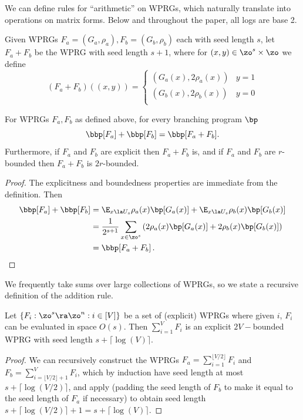 \documentclass{toc}
\begin{document}
We can define rules for ``arithmetic'' on WPRGs, which naturally translate into operations on matrix forms. Below and throughout the paper, all logs are base 2.

\begin{definition}\label{def:addRule}
Given WPRGs $F_a=(G_a,\rho_a),F_b=(G_b,\rho_b)$ each with seed length $s$, let $F_a+F_b$ be the WPRG with seed length $s+1$, where for $(x,y)\in \zo^s\times\zo$ we define
\[
(F_a+F_b)((x,y)) = \begin{cases}
(G_a(x),2\rho_a(x)) & y=1\\
(G_b(x),2\rho_b(x)) & y=0\\
\end{cases}\]
\end{definition}
\begin{lemma}
For WPRGs $F_a,F_b$ as defined above, for every branching program $\bp$
$$\bbp[F_a]+\bbp[F_b]=\bbp[F_a+F_b].$$
Furthermore, if $F_a$ and $F_b$ are explicit then $F_a+F_b$ is, and if $F_a$ and $F_b$ are $r$-bounded then $F_a+F_b$ is $2r$-bounded.
\end{lemma}
\begin{proof}
The explicitness and boundedness properties are immediate from the definition.
Then %
\begin{align*}
    \bbp[F_a]+\bbp[F_b] &= \E_{x\la U_s}\rho_a(x)\bp[G_a(x)]+\E_{x\la U_s}\rho_b(x)\bp[G_b(x)]\\
    &= \frac{1}{2^{s+1}}\sum_{x\in \zo^s}\left(2\rho_a(x)\bp[G_a(x)]+2\rho_b(x)\bp[G_b(x)]\right)\\
    &= \bbp[F_a+F_b]\,.  \qedhere
\end{align*}
\end{proof}
We frequently take sums over large collections of WPRGs, so we state a recursive definition of the addition rule.
\begin{proposition}\label{prop:multiAdd}
Let $\{F_i:\zo^s\ra\zo^n:i\in [V]\}$ be a set of (explicit) WPRGs where given $i$, $F_i$ can be evaluated in space $O(s)$. Then
$\sum_{i=1}^VF_i$
is an explicit $2V-$bounded WPRG with seed length $s+\lceil\log(V)\rceil$.
\end{proposition}
\begin{proof}
We can recursively construct the WPRGs $F_a=\sum_{i=1}^{\lfloor V/2\rfloor}F_i$ and $F_b=\sum_{i=\lfloor V/2\rfloor+1}^{V}F_i$, which by induction have seed length at most $s+\lceil \log(V/2)\rceil$, and apply  (padding the seed length of $F_b$ to make it equal to the seed length of $F_a$ if necessary) to obtain seed length $s+\lceil \log(V/2)\rceil +1=s+\lceil \log(V)\rceil$.
\end{proof}
\end{document}
